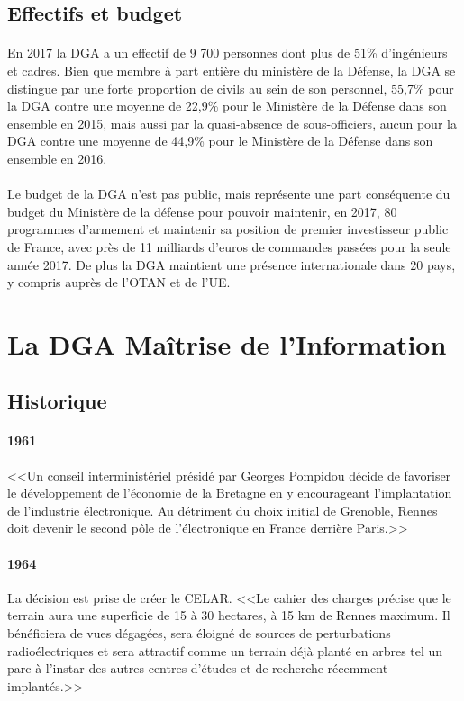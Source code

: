 \documentclass[11pt, book, english, french, standardlists]{upmethodology-document}
\begin{document}
			\subsection{Effectifs et budget}
				\paragraph*{}
					En 2017 la \gls{DGA} a un effectif de 9 700 personnes dont plus de 51\% d'ingénieurs et cadres\cite{PresentationDGA}. Bien que membre à part entière du ministère de la Défense, la \gls{DGA} se distingue par une forte proportion de civils au sein de son personnel, 55,7\% pour la \gls{DGA} contre une moyenne de 22,9\% pour le Ministère de la Défense dans son ensemble en 2015\cite{ChiffresDef2016}, mais aussi par la quasi-absence de sous-officiers, aucun pour la \gls{DGA} contre une moyenne de 44,9\% pour le Ministère de la Défense dans son ensemble en 2016\cite{ChiffresDef2017}.
				\paragraph*{}
					Le budget de la \gls{DGA} n'est pas public, mais représente une part conséquente du budget du Ministère de la défense pour pouvoir maintenir, en 2017, 80 programmes d'armement et maintenir sa position de premier investisseur public de France, avec près de 11 milliards d'euros de commandes passées pour la seule année 2017. De plus la \gls{DGA} maintient une présence internationale dans 20 pays, y compris auprès de l'\gls{OTAN} et de l'\gls{UE}\cite{PresentationDGA}.
		\section{La DGA Maîtrise de l'Information}
			\subsection{Historique}
				\paragraph*{1961}
					<<Un conseil interministériel présidé par Georges Pompidou décide de favoriser le développement de l'économie de la Bretagne en y encourageant l'implantation de l'industrie électronique. Au détriment du choix initial de Grenoble, Rennes doit devenir le second pôle de l'électronique en France derrière Paris.>>\cite{CELAR40ansAvenir}
				\paragraph*{1964}
					La décision est prise de créer le \gls{CELAR}. <<Le cahier des charges précise que le terrain aura une superficie de 15 à 30 hectares, à 15 km de Rennes maximum. Il bénéficiera de vues dégagées, sera éloigné de sources de perturbations radioélectriques et sera attractif comme un terrain déjà planté en arbres tel un parc à l'instar des autres centres d'études et de recherche récemment implantés.>>\cite{CELAR40ansAvenir}
\end{document}
